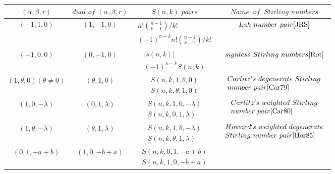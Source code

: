 \begin{center}
\begin{tabular}{c|c|c|c}
$  (\alpha, \beta, r)$ & $ dual\,\, of\,\, (\alpha, \beta, r) $
&$  S(n,k) \,\,pairs $ &$  Name \;\; of \;\; Stirling\,\, numbers $\\ \hline \rule[-3mm]{0mm}{8mm}
$(-1,1,0) $  & $(1,-1,0)$ & $ \begin{array}{cc} n!{n-1\choose {k-1}}/k! \\
(-1)^{n-k}n! {n-1\choose{k-1}}/k! \end{array}$  & $Lah\ number \ pair \cite{JRS}$\\ \hline
\rule[-3mm]{0mm}{8mm}
$(-1,0,0)$  & $(0,-1,0)$
&   $\begin{array}{cc}|s(n,k)|\\ (-1)^{n-k} S(n,k)\end{array}$  & $signless \ Stirling \ numbers\cite{Rot}$\\ \hline
\rule[-3mm]{0mm}{8mm}
$(1,\theta,0) (\theta\not= 0)$ & $(\theta,1,0)$ &  $\begin{array}{cc}S(n,k,1,\theta,0) \\ S(n,k, \theta, 1,0)
\end{array}$ & $\begin{array}{l}Carlitz's\ degenerate\ Stirling \\
number \ pair\cite{Car79}\end{array}$\\ \hline
\rule[-3mm]{0mm}{8mm}
$(1,0,-\lambda)$  & $(0,1,\lambda)$
& $\begin{array}{cc} S(n,k,1,0,-\lambda)\\ S(n,k, 0,1,\lambda)\end{array}$ & $\begin{array}{l}Carlitz's \ weighted\ Stirling\\
number \ pair \cite{Car80}\end{array}$\\ \hline
\rule[-3mm]{0mm}{8mm}
$(1,\theta, -\lambda)$      & $(\theta, 1, \lambda)$ &  $\begin{array} {cc} S(n,k,1,\theta, -\lambda)\\S(n,k, \theta, 1, \lambda)\end{array}$
& $\begin{array} {l}Howard's\ weighted\ degenerate\\ Stirling
\ number\  pair \cite{Hor85}\end{array}$\\ \hline
\rule[-3mm]{0mm}{8mm}
$(0,1,-a+b)$  & $(1,0, -b+a)$        &  $\begin{array}{cc}S(n,k,0,1,-a+b)\\S(n,k,1,0,-b+a)\end{array}$&

\end{tabular}
\end{center}
